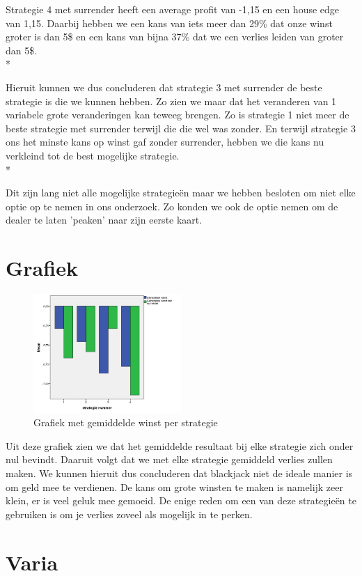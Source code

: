 \documentclass[conference]{IEEEtran}
\begin{document}
Strategie 4 met surrender heeft een average profit van -1,15 en een house edge van 1,15. Daarbij hebben we een kans van iets meer dan 29\% dat onze winst groter is dan 5\$ en een kans van bijna 37\% dat we een verlies leiden van groter dan 5\$. \\*
 
Hieruit kunnen we dus concluderen dat strategie 3 met surrender de beste strategie is die we kunnen hebben. Zo zien we maar dat het veranderen van 1 variabele grote veranderingen kan teweeg brengen. Zo is strategie 1 niet meer de beste strategie met surrender terwijl die die wel was zonder. En terwijl strategie 3 ons het minste kans op winst gaf zonder surrender, hebben we die kans nu verkleind tot de best mogelijke strategie.\\*

Dit zijn lang niet alle mogelijke strategie\"en maar we hebben besloten om niet elke optie op te nemen in ons onderzoek. Zo konden we ook de optie nemen om de dealer te laten 'peaken' naar zijn eerste kaart.

\section{Grafiek}

\begin{figure}[h!]
	\centering
		\includegraphics[width=0.5\textwidth]{GrafiekProfit.jpeg}
	\caption{Grafiek met gemiddelde winst per strategie}
	\label{fig:GrafiekProfit}
\end{figure}

Uit deze grafiek zien we dat het gemiddelde resultaat bij elke strategie zich onder nul bevindt. Daaruit volgt dat we met elke strategie gemiddeld verlies zullen maken. We kunnen hieruit dus concluderen dat blackjack niet de ideale manier is om geld mee te verdienen. De kans om grote winsten te maken is namelijk zeer klein, er is veel geluk mee gemoeid. De enige reden om een van deze strategie\"en te gebruiken is om je verlies zoveel als mogelijk in te perken.

\section{Varia}


\nocite{*}
\end{document}
